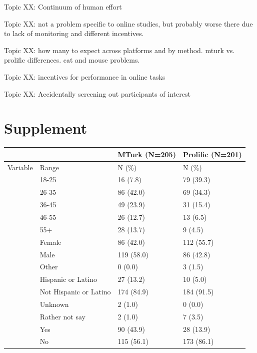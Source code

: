\documentclass[a4paper,notitlepage,12pt]{article}
\begin{document}
Topic XX: Continuum of human effort

Topic XX: not a problem specific to online studies, but probably worse there due to lack of monitoring and different incentives.

Topic XX: how many to expect across platforms and by method. mturk vs. prolific differences. cat and mouse problems.

Topic XX: incentives for performance in online tasks

Topic XX: Accidentally screening out participants of interest

\section{Supplement}

\begin{tabular}{ |p{2cm}|p{4.5cm}|p{2.5cm}|p{2.5cm}|  }
 \hline
 & & MTurk (N=205) & Prolific (N=201) \\
  \hline
 Variable & Range & N (\%)  & N (\%) \\
 \hline
  & 18-25 & 16 (7.8) & 79 (39.3) \\
  & 26-35 & 86 (42.0) & 69 (34.3) \\ 
  & 36-45 & 49 (23.9) & 31 (15.4) \\
  & 46-55 & 26 (12.7) & 13 (6.5) \\
  & 55+ & 28 (13.7) & 9 (4.5) \\
  \hline
  & Female & 86 (42.0) & 112 (55.7) \\ 
  & Male & 119 (58.0) & 86 (42.8) \\ 
  & Other & 0 (0.0) & 3 (1.5) \\
  \hline
  & Hispanic or Latino & 27 (13.2) & 10 (5.0) \\
  & Not Hispanic or Latino & 174 (84.9) & 184 (91.5) \\ 
  & Unknown & 2 (1.0) & 0 (0.0) \\
  & Rather not say & 2 (1.0) & 7 (3.5) \\
  \hline
  & Yes & 90 (43.9) & 28 (13.9) \\
  & No & 115 (56.1) & 173 (86.1) \\ 
\end{tabular}


\end{document}
